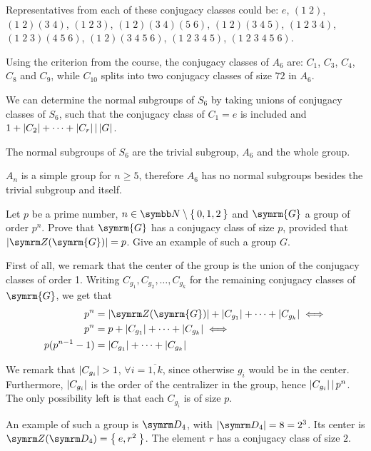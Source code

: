 \begin{solution}
Representatives from each of these conjugacy classes could be: \(e\), \((1 \; 2)\), \((1 \; 2) (3 \; 4)\), \((1 \; 2 \; 3)\), \((1 \; 2) (3 \; 4) (5 \; 6)\), \((1 \; 2) (3 \; 4 \; 5)\), \((1 \; 2\; 3 \; 4)\), \((1 \; 2 \; 3) (4 \; 5 \; 6)\), \((1 \; 2) (3 \; 4 \; 5 \; 6)\), \((1 \; 2 \; 3 \; 4 \; 5)\), \((1 \; 2 \; 3 \; 4 \; 5 \; 6)\).

Using the criterion from the course, the conjugacy classes of \(A_6\) are: \(C_1\), \(C_3\), \(C_4\), \(C_8\) and \(C_9\), while \(C_{10}\) splits into two conjugacy classes of size \(72\) in \(A_6\).

We can determine the normal subgroups of \(S_6\) by taking unions of conjugacy classes of \(S_6\), such that the conjugacy class of \(C_1 = e\) is included and \(1 + \left|C_2\right| + \dots + \left|C_r\right| \operatorname*{\mid} \left|G\right|\).

The normal subgroups of \(S_6\) are the trivial subgroup, \(A_6\) and the whole group.

\(A_n\) is a simple group for \(n \geq 5\), therefore \(A_6\) has no normal subgroups besides the trivial subgroup and itself.
\end{solution}

\begin{exercise}
Let \(p\) be a prime number, \(n \in \naturals \setminus \Set{0, 1, 2}\) and \(\symrm{G}\) a group of order \(p^n\). Prove that \(\symrm{G}\) has a conjugacy class of size \(p\), provided that \(\abs{\centerofgroup(\symrm{G})} = p\). Give an example of such a group \(G\).
\end{exercise}
\begin{solution}
First of all, we remark that the center of the group is the union of the conjugacy classes of order 1. Writing \(C_{g_1}, C_{g_2}, \dots, C_{g_k}\) for the remaining conjugacy classes of \(\symrm{G}\), we get that
\begin{align*}
    p^n &= \abs{\centerofgroup(\symrm{G})} + \abs{C_{g_1}} + \dots + \abs{C_{g_k}} \iff \\
    p^n &= p + \abs{C_{g_1}} + \dots + \abs{C_{g_k}} \iff \\
    p (p^{n-1} - 1) &= \abs{C_{g_1}} + \dots + \abs{C_{g_k}}
\end{align*}

We remark that \(\left|C_{g_i}\right| > 1\), \(\forall i = \overline{1, k}\), since otherwise \(g_i\) would be in the center. Furthermore, \(\left|C_{g_i}\right|\) is the order of the centralizer in the group, hence \(\left|C_{g_i}\right| \operatorname*{\mid} p^n\). The only possibility left is that each \(C_{g_i}\) is of size \(p\).

An example of such a group is \(\dihedralgroup{4}\), with \(\abs{\dihedralgroup{4}} = 8 = 2^3\). Its center is \(\centerofgroup(\dihedralgroup{4}) = \Set{e, r^2}\). The element \(r\) has a conjugacy class of size \(2\).
\end{solution}

